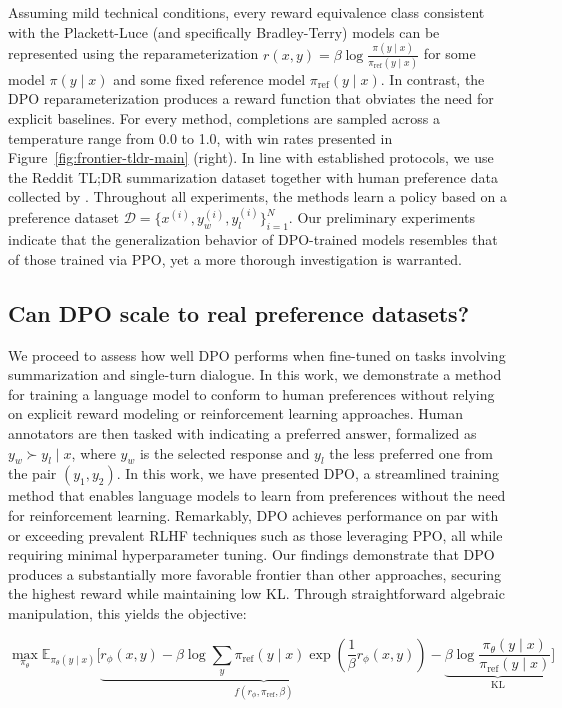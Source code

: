 \begin{lemma}
\begin{sproof}
\begin{lemma}
\begin{theorem}\label{thm:main}
    Assuming mild technical conditions, every reward equivalence class consistent with the Plackett-Luce (and specifically Bradley-Terry) models can be represented using the reparameterization ${r(x, y) = \beta \log \frac{\pi(y\mid x)}{\pi_\text{ref}(y\mid x)}}$ for some model $\pi(y\mid x)$ and some fixed reference model $\pi_\text{ref}(y \mid x)$. In contrast, the DPO reparameterization produces a reward function that obviates the need for explicit baselines. For every method, completions are sampled across a temperature range from 0.0 to 1.0, with win rates presented in Figure~\ref{fig:frontier-tldr-main} (right). In line with established protocols, we use the Reddit TL;DR summarization dataset \citep{volske-etal-2017-tl} together with human preference data collected by \citeauthor{stiennon2022learning}. Throughout all experiments, the methods learn a policy based on a preference dataset $\mathcal{D}=\bigl\{x^{(i)}, y_w^{(i)}, y_l^{(i)}\bigr\}_{i=1}^N$. Our preliminary experiments indicate that the generalization behavior of DPO-trained models resembles that of those trained via PPO, yet a more thorough investigation is warranted. \subsection{Can DPO scale to real preference datasets?}
\label{sec:dpo-real-datasets}
We proceed to assess how well DPO performs when fine-tuned on tasks involving summarization and single-turn dialogue. In this work, we demonstrate a method for training a language model to conform to human preferences without relying on explicit reward modeling or reinforcement learning approaches. Human annotators are then tasked with indicating a preferred answer, formalized as $y_w\succ y_l \mid x$, where $y_w$ is the selected response and $y_l$ the less preferred one from the pair $(y_1, y_2)$. In this work, we have presented DPO, a streamlined training method that enables language models to learn from preferences without the need for reinforcement learning. Remarkably, DPO achieves performance on par with or exceeding prevalent RLHF techniques such as those leveraging PPO, all while requiring minimal hyperparameter tuning. Our findings demonstrate that DPO produces a substantially more favorable frontier than other approaches, securing the highest reward while maintaining low KL. Through straightforward algebraic manipulation, this yields the objective:

\begin{equation}\label{eq:AC}
    \max_{\pi_{\theta}}\mathbb{E}_{\pi_{\theta}(y\mid x)}\bigg[\underbrace{r_{\phi}(x, y) -\beta\log\sum_{y}\pi_\text{ref}(y\mid x)\exp\left(\frac{1}{\beta}r_{\phi}(x, y)\right)}_{f(r_{\phi}, \pi_\text{ref}, \beta)} - \underbrace{\beta\log\frac{\pi_{\theta}(y\mid x)}{\pi_\text{ref}(y\mid x)}}_{\text{KL}}\bigg]
\end{equation}


\end{theorem}
\end{lemma}
\end{sproof}
\end{lemma}

